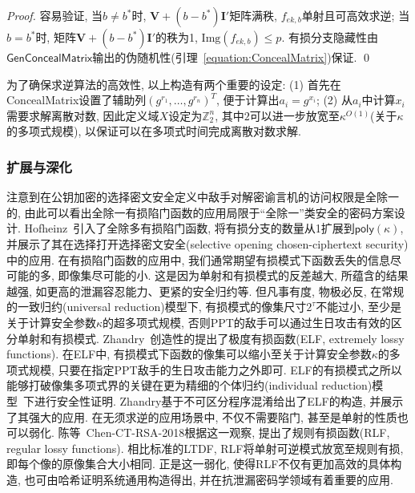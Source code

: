 \begin{proof}
容易验证, 当$b \neq b^*$时, $\mathbf{V}+(b-b^*)\mathbf{I}'$矩阵满秩, $f_{ek, b}$单射且可高效求逆; 
当$b = b^*$时, 矩阵$\mathbf{V}+(b-b^*)\mathbf{I}'$的秩为1, $\text{Img}(f_{ek, b}) \leq p$. 
有损分支隐藏性由$\mathsf{GenConcealMatrix}$输出的伪随机性(引理~\ref{equation:ConcealMatrix})保证. \qed
\end{proof}

\begin{remark}
为了确保求逆算法的高效性, 以上构造有两个重要的设定: (1) 首先在ConcealMatrix设置了辅助列$(g^{r_1}, \dots, g^{r_n})^T$, 
便于计算出$a_i = g^{x_i}$; (2) 从$a_i$中计算$x_i$需要求解离散对数, 
因此定义域$X$设定为$\mathbb{Z}_2^n$, 其中$2$可以进一步放宽至$\kappa^{O(1)}$(关于$\kappa$的多项式规模), 
以保证可以在多项式时间完成离散对数求解. 
\end{remark}

\subsubsection*{扩展与深化}
注意到在公钥加密的选择密文安全定义中敌手对解密谕言机的访问权限是全除一的, 
由此可以看出全除一有损陷门函数的应用局限于``全除一''类安全的密码方案设计.  
Hofheinz~\cite{Hofheinz-EUROCRYPT-2012}引入了全除多有损陷门函数, 
将有损分支的数量从1扩展到$\mathsf{poly}(\kappa)$, 并展示了其在选择打开选择密文安全(selective opening chosen-ciphertext security)中的应用.
在有损陷门函数的应用中, 我们通常期望有损模式下函数丢失的信息尽可能的多, 即像集尽可能的小. 这是因为单射和有损模式的反差越大, 所蕴含的结果越强, 
如更高的泄漏容忍能力、更紧的安全归约等. 但凡事有度, 物极必反, 在常规的一致归约(universal reduction)模型下, 
有损模式的像集尺寸$2^\tau$不能过小, 至少是关于计算安全参数$\kappa$的超多项式规模, 否则PPT的敌手可以通过生日攻击有效的区分单射和有损模式. 
Zhandry~\cite{Zhandry-CRYPTO-2016}创造性的提出了极度有损函数(ELF, extremely lossy functions). 
在ELF中, 有损模式下函数的像集可以缩小至关于计算安全参数$\kappa$的多项式规模, 只要在指定PPT敌手的生日攻击能力之外即可. 
ELF的有损模式之所以能够打破像集多项式界的关键在更为精细的个体归约(individual reduction)模型~\cite{Deng-EUROCRYPT-2017}下进行安全性证明.  
Zhandry基于不可区分程序混淆给出了ELF的构造, 并展示了其强大的应用.   
在无须求逆的应用场景中, 不仅不需要陷门, 甚至是单射的性质也可以弱化. 
陈等~{Chen-CT-RSA-2018}根据这一观察, 提出了规则有损函数(RLF, regular lossy functions). 
相比标准的LTDF, RLF将单射可逆模式放宽至规则有损, 即每个像的原像集合大小相同. 
正是这一弱化, 使得RLF不仅有更加高效的具体构造, 也可由哈希证明系统通用构造得出, 并在抗泄漏密码学领域有着重要的应用.     

